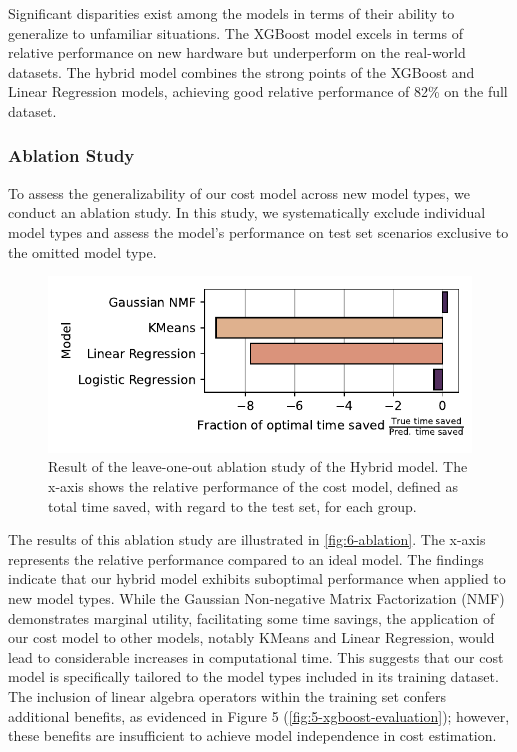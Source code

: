 Significant disparities exist among the models in terms of their ability to generalize to unfamiliar situations. The XGBoost model excels in terms of relative performance on new hardware but underperform on the real-world datasets. The hybrid model combines the strong points of the XGBoost and Linear Regression models, achieving good relative performance of 82\% on the full dataset.

\subsubsection{Ablation Study}
\label{subsubsec:6-ablation}
To assess the generalizability of our cost model across new model types, we conduct an ablation study. In this study, we systematically exclude individual model types and assess the model’s performance on test set scenarios exclusive to the omitted model type.

\begin{figure}[ht]
  \centering
  \includegraphics[width=0.6\linewidth]{chapters/06_evaluation/figures/hybrid-ablation.pdf}
  \caption[Results of the ablation study]{Result of the leave-one-out ablation study of the Hybrid model. The x-axis shows the relative performance of the cost model, defined as total time saved, with regard to the test set, for each group.}
  \label{fig:6-ablation}
\end{figure}

The results of this ablation study are illustrated in \autoref{fig:6-ablation}. The x-axis represents the relative performance compared to an ideal model. The findings indicate that our hybrid model exhibits suboptimal performance when applied to new model types. While the Gaussian Non-negative Matrix Factorization (NMF) demonstrates marginal utility, facilitating some time savings, the application of our cost model to other models, notably KMeans and Linear Regression, would lead to considerable increases in computational time. This suggests that our cost model is specifically tailored to the model types included in its training dataset. The inclusion of linear algebra operators within the training set confers additional benefits, as evidenced in Figure 5 (\autoref{fig:5-xgboost-evaluation}); however, these benefits are insufficient to achieve model independence in cost estimation.

